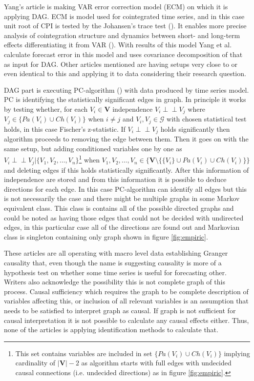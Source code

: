 \documentclass[main=english,12pt,a4paper,pdftex,econ,utf8]{aaltothesis}
\newcommand{\indep}{\perp \!\!\! \perp}
\newcommand{\ch}[1]{Ch(#1)}
\newcommand{\pa}[1]{Pa(#1)}
\newcommand{\g}{\mathcal{G}}
\newcommand{\vars}{\bm{V}}
\begin{document}


Yang's article is making VAR error correction model (ECM) on which it is applying DAG. ECM is model used for cointegrated time series, and in this case unit root of CPI is tested by the Johansen's trace test (\cite{Johansen1991}). It enables more precise analysis of cointegration structure and dynamics between short- and long-term effects differentiating it from VAR (\cite{lütkepohl_krätzig_2004}). With results of this model Yang et al. calculate forecast error in this model and uses covariance decomposition of that as input for DAG. Other articles mentioned are having setups very close to or even identical to this and applying it to data considering their research question.

DAG part is executing PC-algorithm (\cite{Spirtes2000}) with data produced by time series model. PC is identifying the statistically significant edges in graph. In principle it works by testing whether, for each $V_{i}\in\vars$ independence $V_{i}\indep V_{j}$ where $V_{j}\in\{\pa{V_{i}}\cup\ch{V_{i}}\}$
when $i\neq j$ and $V_{i},V_{j}\in\g$ with chosen statistical test holds, in this case Fischer's z-statistic. If $V_{i}\indep V_{j}$ holds significantly then algorithm proceeds to removing the edge between them. Then it goes on with the same setup, but adding conditioned variables one by one as $V_{i}\indep V_{j}|\{V_{1},V_{2},\ldots,V_{n}\}$\footnote{This set contains variables are included in set $\{\pa{V_{i}}\cup\ch{V_{i}}\}$ implying cardinality of $|\vars|-2$ as algorithm starts with full edges with undecided causal connections (i.e. undecided directions) as in figure \ref{fig:empiric}.} when $V_{1},V_{2},\ldots,V_{n}\in\{\vars\setminus\{\{V_{i}\}\cup\pa{V_{i}}\cup\ch{V_{i}}\}\}$ and deleting edges if this holds statistically significantly. After this information of independence are stored and from this information it is possible to deduce directions for each edge. In this case PC-algorithm can identify all edges but this is not necessarily the case and there might be multiple graphs in some Markov equivalent class. This class is contains all of the possible directed graphs and could be noted as having those edges that could not be decided with undirected edges, in this particular case all of the directions are found out and Markovian class is singleton containing only graph shown in figure \ref{fig:empiric}.

These articles are all operating with macro level data establishing Granger causality that, even though the name is suggesting causality is more of a hypothesis test on whether some time series is useful for forecasting other. Writers also acknowledge the possibility this is not complete graph of this process. Causal sufficiency which requires the graph to be complete description of variables affecting this, or inclusion of all relevant variables is an assumption that needs to be satisfied to interpret graph as causal. If graph is not sufficient for causal interpretation it is not possible to calculate any causal effects either. Thus, none of the articles is applying identification methods to calculate that. 
\end{document}
